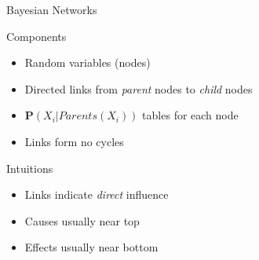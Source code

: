 \documentclass[14pt]{beamer}
\begin{document}
\begin{frame}{Bayesian Networks}
	\begin{block}{Components}
		\begin{itemize}
			\item Random variables (nodes)
			\item Directed links from \textit{parent} nodes to \textit{child} nodes
			\item $\mathbf{P}(X_{i}|\textit{Parents}(X_{i}))$ tables for each node
			\item Links form no cycles
		\end{itemize}
	\end{block}
	\pause
	\begin{block}{Intuitions}
		\begin{itemize}
			\item Links indicate \emph{direct} influence
			\item Causes usually near top
			\item Effects usually near bottom
		\end{itemize}
	\end{block}
\end{frame}
\end{document}
